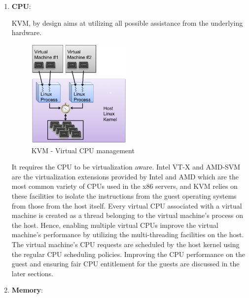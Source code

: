 \begin{enumerate}
\item \textbf{CPU}:

KVM, by design aims at utilizing all possible assistance from the underlying hardware. 
\begin{figure}[htbp]
\centering
    \includegraphics[width=0.48\textwidth]{kvm-cpu.png}
  \caption{KVM - Virtual CPU management}
\end{figure}
It requires the CPU to be virtualization aware. Intel VT-X \cite{intelvtx} and AMD-SVM \cite{amdv} are the virtualization extensions provided by Intel and AMD which are the most common variety of CPUs used in the x86 servers, and KVM relies on these facilities to isolate the instructions from the guest operating systems from those from the host itself. Every virtual CPU associated with a virtual machine is created as a thread belonging to the virtual machine's process on the host. Hence, enabling multiple virtual CPUs improve the virtual machine's performance by utilizing the multi-threading facilities on the host. The virtual machine's CPU requests are scheduled by the host kernel using the regular CPU scheduling policies. Improving the CPU performance on the guest and ensuring fair CPU entitlement for the guests are discussed in the later sections.   

\item \textbf{Memory}:


\end{enumerate}
